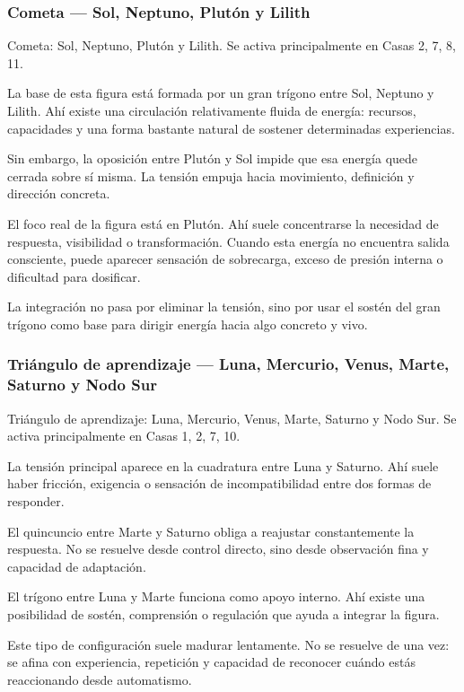 \documentclass[11pt,a4paper]{article}
\begin{document}
\subsubsection*{Cometa — Sol, Neptuno, Plutón y Lilith}
Cometa: Sol, Neptuno, Plutón y Lilith. Se activa principalmente en Casas 2, 7, 8, 11.

La base de esta figura está formada por un gran trígono entre Sol, Neptuno y Lilith. Ahí existe una circulación relativamente fluida de energía: recursos, capacidades y una forma bastante natural de sostener determinadas experiencias.

Sin embargo, la oposición entre Plutón y Sol impide que esa energía quede cerrada sobre sí misma. La tensión empuja hacia movimiento, definición y dirección concreta.

El foco real de la figura está en Plutón. Ahí suele concentrarse la necesidad de respuesta, visibilidad o transformación. Cuando esta energía no encuentra salida consciente, puede aparecer sensación de sobrecarga, exceso de presión interna o dificultad para dosificar.

La integración no pasa por eliminar la tensión, sino por usar el sostén del gran trígono como base para dirigir energía hacia algo concreto y vivo.

\subsubsection*{Triángulo de aprendizaje — Luna, Mercurio, Venus, Marte, Saturno y Nodo Sur}
Triángulo de aprendizaje: Luna, Mercurio, Venus, Marte, Saturno y Nodo Sur. Se activa principalmente en Casas 1, 2, 7, 10.

La tensión principal aparece en la cuadratura entre Luna y Saturno. Ahí suele haber fricción, exigencia o sensación de incompatibilidad entre dos formas de responder.

El quincuncio entre Marte y Saturno obliga a reajustar constantemente la respuesta. No se resuelve desde control directo, sino desde observación fina y capacidad de adaptación.

El trígono entre Luna y Marte funciona como apoyo interno. Ahí existe una posibilidad de sostén, comprensión o regulación que ayuda a integrar la figura.

Este tipo de configuración suele madurar lentamente. No se resuelve de una vez: se afina con experiencia, repetición y capacidad de reconocer cuándo estás reaccionando desde automatismo.
\end{document}
